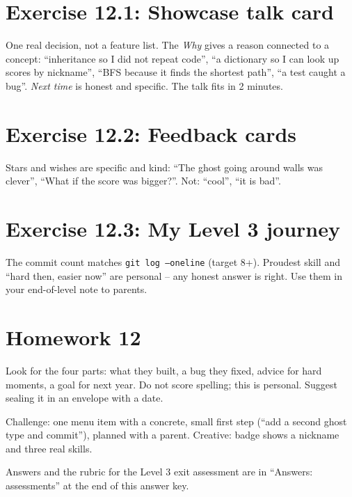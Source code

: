 
\section{Exercise 12.1: Showcase talk card}
\begin{answer}
One real decision, not a feature list. The \emph{Why} gives a reason connected to a concept: \enquote{inheritance so I did not repeat code}, \enquote{a dictionary so I can look up scores by nickname}, \enquote{BFS because it finds the shortest path}, \enquote{a test caught a bug}. \emph{Next time} is honest and specific. The talk fits in 2 minutes.
\end{answer}

\section{Exercise 12.2: Feedback cards}
\begin{answer}
Stars and wishes are specific and kind: \enquote{The ghost going around walls was clever}, \enquote{What if the score was bigger?}. Not: \enquote{cool}, \enquote{it is bad}.
\end{answer}

\section{Exercise 12.3: My Level 3 journey}
\begin{answer}
The commit count matches \texttt{git log --oneline} (target 8+). Proudest skill and \enquote{hard then, easier now} are personal -- any honest answer is right. Use them in your end-of-level note to parents.
\end{answer}

\section{Homework 12}
\begin{answer}
Look for the four parts: what they built, a bug they fixed, advice for hard moments, a goal for next year. Do not score spelling; this is personal. Suggest sealing it in an envelope with a date.
\end{answer}
\begin{answer}
Challenge: one menu item with a concrete, small first step (\enquote{add a second ghost type and commit}), planned with a parent. Creative: badge shows a nickname and three real skills.
\end{answer}

\begin{teachernote}
Answers and the rubric for the Level 3 exit assessment are in \enquote{Answers: assessments} at the end of this answer key.
\end{teachernote}
